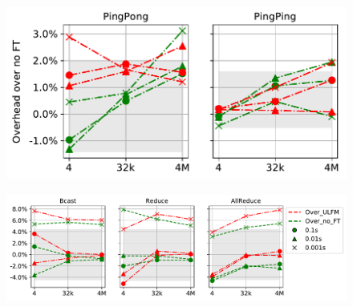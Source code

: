 \documentclass[sigconf]{acmart}
\begin{document}
\begin{figure}[h]
\centering
\begin{minipage}{.38\textwidth}
  \centering
  \includegraphics[width=\linewidth]{multi_pingping_pingpong_overhead.pdf}
  \label{fig:Ring}
\end{minipage}%
\begin{minipage}{.62\textwidth}
  \centering
  \includegraphics[width=\linewidth]{Bcast_overhead_with_ulfm_max_col.pdf}
  \label{fig:Reconnect Ring}
\end{minipage}
\end{figure}
\end{document}
